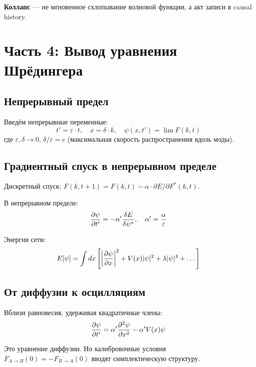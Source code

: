 \documentclass[11pt,a4paper]{article}
\theoremstyle{definition}
\begin{document}
\textbf{Коллапс} --- не мгновенное схлопывание волновой функции, а акт записи в causal history.

\newpage
\section{Часть 4: Вывод уравнения Шрёдингера}

\subsection{Непрерывный предел}

Введём непрерывные переменные:
\begin{equation}
    t' = \varepsilon \cdot t, \quad x = \delta \cdot k, \quad \psi(x, t') = \lim F(k, t)
\end{equation}
где $\varepsilon, \delta \to 0$, $\delta/\varepsilon = c$ (максимальная скорость распространения вдоль моды).

\subsection{Градиентный спуск в непрерывном пределе}

Дискретный спуск: $F(k, t+1) = F(k, t) - \alpha \cdot \partial E / \partial F^*(k, t)$.

В непрерывном пределе:
\begin{equation}
    \pdv{\psi}{t'} = -\alpha' \frac{\delta E}{\delta \psi^*}, \quad \alpha' = \frac{\alpha}{\varepsilon}
\end{equation}

Энергия сети:
\begin{equation}
    E[\psi] = \int dx \left[ \left| \pdv{\psi}{x} \right|^2 + V(x)|\psi|^2 + \lambda|\psi|^4 + \dots \right]
\end{equation}

\subsection{От диффузии к осцилляциям}

Вблизи равновесия, удерживая квадратичные члены:
\begin{equation}
    \pdv{\psi}{t'} = \alpha' \pdv[2]{\psi}{x} - \alpha' V(x) \psi
\end{equation}

Это уравнение диффузии. Но калибровочные условия $F_{A \to B}(0) = -F_{B \to A}(0)$ вводят симплектическую структуру.
\end{document}
